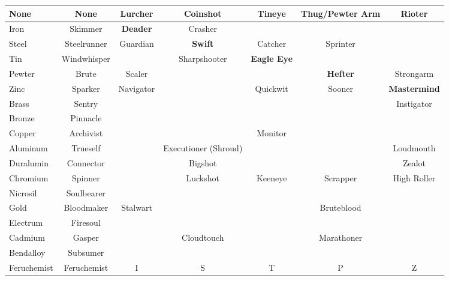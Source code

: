 \documentclass[conference]{IEEEtran}
\begin{document}
\begin{table}[h]
\begin{center}
\begin{tabular}{|l |c |c |c |c |c |c | }
		\hline
		None&None&\cellcolor{darkgreen}Lurcher&\cellcolor{darkgreen}Coinshot&\cellcolor{darkgreen}Tineye&\cellcolor{darkgreen}Thug/Pewter Arm&\cellcolor{darkgreen}Rioter\\\hline
		Iron&\cellcolor{darkgreen}Skimmer&\cellcolor{lightgreen}\textbf{Deader}&\cellcolor{darkgreen}Crasher& & & \\\hline
		Steel&\cellcolor{darkgreen}Steelrunner&\cellcolor{lightgreen}Guardian&\cellcolor{lightgreen}\textbf{Swift}&\cellcolor{lightgreen}Catcher& \cellcolor{lightgreen}Sprinter& \\\hline
		Tin&\cellcolor{darkgreen}Windwhisper& &\cellcolor{lightgreen}Sharpshooter&\cellcolor{lightgreen}\textbf{Eagle Eye}& & \\\hline
		Pewter&\cellcolor{darkgreen}Brute&\cellcolor{lightgreen} Scaler& & &\cellcolor{lightgreen}\textbf{Hefter}&\cellcolor{lightgreen} Strongarm \\\hline
		Zinc&\cellcolor{darkgreen}Sparker&\cellcolor{lightgreen}Navigator& &\cellcolor{lightgreen}Quickwit&\cellcolor{lightgreen}Sooner& \cellcolor{lightgreen}\textbf{Mastermind} \\\hline
		Brass&\cellcolor{orange}Sentry& & & & & \cellcolor{lightorange}Instigator  \\\hline
		Bronze&\cellcolor{darkgreen}Pinnacle& & & & & 
		\\\hline
		Copper&\cellcolor{darkgreen}Archivist& & &  \cellcolor{lightgreen}Monitor
		& &\\\hline
		Aluminum&\cellcolor{darkgreen}Trueself& &\cellcolor{red} Executioner (Shroud) & &  &\cellcolor{lightgreen}Loudmouth\\\hline
		Duralumin&\cellcolor{darkgreen}Connector& &\cellcolor{lightgreen}Bigshot& & &\cellcolor{lightgreen}Zealot \\\hline
		Chromium& \cellcolor{darkgreen}Spinner &&\cellcolor{lightgreen}Luckshot&\cellcolor{lightgreen}Keeneye&\cellcolor{lightgreen}Scrapper&\cellcolor{lightgreen}High Roller\\\hline
		Nicrosil&\cellcolor{darkgreen}Soulbearer&&&&& \\\hline
		Gold&\cellcolor{darkgreen}Bloodmaker&\cellcolor{lightgreen}Stalwart&&&\cellcolor{lightgreen}Bruteblood& \\\hline
		Electrum&\cellcolor{orange}Firesoul& & & & &  \\\hline
		Cadmium&\cellcolor{darkgreen}Gasper&&\cellcolor{lightgreen}Cloudtouch&&\cellcolor{lightgreen}Marathoner& \\\hline
		Bendalloy&\cellcolor{darkgreen}Subsumer&&&&& \\\hline
		Feruchemist&\cellcolor{darkgreen}Feruchemist&I&S&T&P&Z \\\hline
		\hline
		

\end{tabular}
\end{center}
\end{table}
\end{document}
